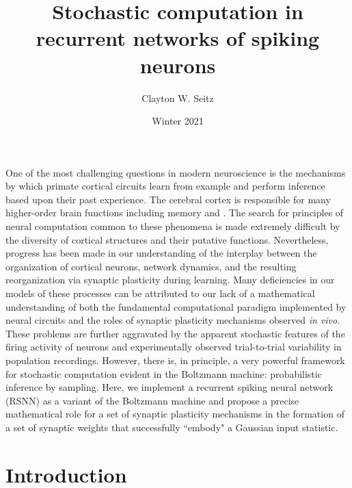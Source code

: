 \documentclass{ucetd}
\title{Stochastic computation in recurrent networks of spiking neurons}
\author{Clayton W. Seitz}
\date{Winter 2021}
\begin{document}
\maketitle

\makecopyright
\makeepigraph


\tableofcontents

\acknowledgments

\abstract

One of the most challenging questions in modern neuroscience is the mechanisms by which primate cortical circuits learn from example and perform inference based upon their past experience. The cerebral cortex is responsible for many higher-order brain functions including memory and . The search for principles of neural computation common to these phenomena is made extremely difficult by the diversity of cortical structures and their putative functions. Nevertheless, progress has been made in our understanding of the interplay between the organization of cortical neurons, network dynamics, and the resulting reorganization via synaptic plasticity during learning. Many deficiencies in our models of these processes can be attributed to our lack of a mathematical understanding of both the fundamental computational paradigm implemented by neural circuits and the roles of synaptic plasticity mechanisms observed \emph{in vivo}. These problems are further aggravated by the apparent stochastic features of the firing activity of neurons and experimentally observed trial-to-trial variability in population recordings. However, there is, in principle, a very powerful framework for stochastic computation evident in the Boltzmann machine: probabilistic inference by sampling. Here, we implement a recurrent spiking neural network (RSNN) as a variant of the Boltzmann machine and propose a precise mathematical role for a set of synaptic plasticity mechanisms in the formation of a set of synaptic weights that successfully ``embody" a Gaussian input statistic.


\mainmatter

\chapter{Introduction}
\end{document}
